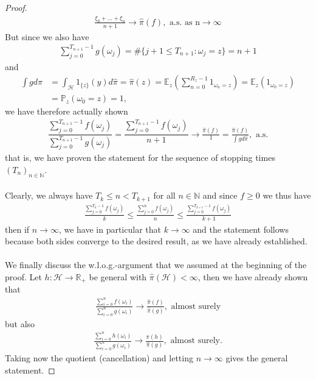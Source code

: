 \documentclass[11pt,a4paper, final]{article}
\theoremstyle{definition}
\begin{document}
\begin{proof}
\begin{align*}
\frac{\xi_0 + \dots + \xi_n}{n+1} \to \hat{\pi}(f), \text{ a.s. as n} \to \infty 
\end{align*}
But since we also have 
\begin{align*}
\sum_{j=0}^{T_{n+1}-1} g( \omega_j) = \# \lbrace j +1 \leq T_{n+1} : \omega_j = z \rbrace = n+1
\end{align*}
and 
\begin{align*}
\int g d \hat{\pi} &= \int_{ \mathcal{H}} 1_{ \lbrace z \rbrace } (y) d \hat{\pi }= \hat{\pi}(z) = \mathbb{E}_z \left( \sum_{n=0}^{R_z-1} 1_{ \omega_n = z } \right)= \mathbb{E}_z( 1_{ \omega_0 = z } ) \\ 
& = \mathbb{P}_z ( \omega_0 =z ) = 1,
\end{align*}
we have therefore actually shown 
\begin{align*}
\dfrac{\sum_{j=0}^{T_{n+1}-1} f( \omega_j)}{\sum_{j=0}^{T_{n+1}-1} g( \omega_j)} = \dfrac{\sum_{j=0}^{T_{n+1}-1} f( \omega_j)}{n+1} \to \frac{\hat{\pi}(f)}{1} = \frac{\hat{\pi}(f)}{ \int g d \hat{\pi}}, \text{ a.s.}
\end{align*}
that is, we have proven the statement for the sequence of stopping times $(T_n)_{n \in \mathbb{N}}$. \\
\\
Clearly, we always have $T_k \leq n < T_{k+1}$ for all $n \in \mathbb{N}$ and since $f \geq 0$ we thus have 
\begin{align*}
\frac{\sum_{j=0}^{T_k-1}f ( \omega_j)}{k} \leq \frac{\sum_{j=0}^n f( \omega_j)}{n} \leq \frac{\sum_{j=0}^{T_{k+1}-1}f( \omega_j)}{k+1}
\end{align*}
then if $n \to \infty$, we have in particular that $k \to \infty$ and the statement follows because both sides converge to the desired result, as we have already established.
\\\\
We finally discuss the w.l.o.g.-argument that we assumed at the beginning of the proof. Let $h: \mathcal{H} \to \mathbb{R}_+$ be general with $\hat{\pi}( \mathcal{H}) < \infty$, then we have already shown that 
\begin{align*}
\frac{\sum_{i=0}^n f( \omega_i)}{\sum_{i=0}^n g( \omega_i)} \to \frac{\hat{\pi}(f)}{\hat{\pi}(g)}, \text{ almost surely}
\end{align*}
but also 
\begin{align*}
 \frac{\sum_{i=0}^n h( \omega_i)}{\sum_{i=0}^n g( \omega_i)} \to \frac{\hat{\pi}(h)}{\hat{\pi}(g)}, \text{ almost surely}.
\end{align*}
Taking now the quotient (cancellation) and letting $n \to \infty$ gives the general statement. 
\end{proof}
\end{document}
